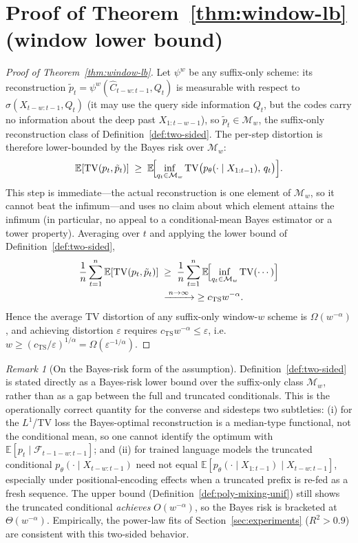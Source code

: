 \documentclass[11pt]{article}
\newcommand{\E}{\mathbb{E}}
\newcommand{\F}{\mathcal{F}}
\newcommand{\Chat}{\hat{C}}
\newcommand{\TV}{\mathrm{TV}}
\theoremstyle{plain}
\theoremstyle{definition}
\theoremstyle{remark}
\newtheorem{remark}[theorem]{Remark}
\begin{document}
\section{Proof of Theorem~\ref{thm:window-lb} (window lower bound)}
\label{app:window-lb}

\begin{proof}[Proof of Theorem~\ref{thm:window-lb}]
Let $\psi^w$ be any suffix-only scheme: its reconstruction
$\tilde p_t = \psi^w(\Chat_{t-w:t-1}, Q_t)$ is measurable with
respect to $\sigma(X_{t-w:t-1}, Q_t)$ (it may use the query side
information $Q_t$, but the codes carry no information about the deep
past $X_{1:t-w-1}$), so $\tilde p_t \in \mathcal{M}_w$, the
suffix-only reconstruction class of
Definition~\ref{def:two-sided}. The per-step distortion is
therefore lower-bounded by the Bayes risk over $\mathcal{M}_w$:
\[
\E[\TV(p_t, \tilde p_t)]
\;\geq\;
\E\!\Bigl[\inf_{q_t \in \mathcal{M}_w}
   \TV\bigl(p_\theta(\cdot \mid X_{1:t-1}),\, q_t\bigr)\Bigr].
\]
This step is immediate---the actual reconstruction is one element
of $\mathcal{M}_w$, so it cannot beat the infimum---and uses no
claim about which element attains the infimum (in particular, no
appeal to a conditional-mean Bayes estimator or a tower property).
Averaging over $t$ and applying the lower bound of
Definition~\ref{def:two-sided},
\[
\begin{split}
\frac{1}{n}\sum_{t=1}^n \E[\TV(p_t, \tilde p_t)]
&\;\geq\;
\frac{1}{n}\sum_{t=1}^n \E\!\Bigl[\inf_{q_t \in \mathcal{M}_w}
   \TV(\cdots)\Bigr]\\
&\;\xrightarrow{\;n\to\infty\;}\;
\geq c_{\mathrm{TS}} w^{-\alpha}.
\end{split}
\]
Hence the average TV distortion of any suffix-only window-$w$
scheme is $\Omega(w^{-\alpha})$, and achieving distortion
$\varepsilon$ requires $c_{\mathrm{TS}} w^{-\alpha} \leq
\varepsilon$, i.e.\ $w \geq (c_{\mathrm{TS}}/\varepsilon)^{1/\alpha}
= \Omega(\varepsilon^{-1/\alpha})$.
\end{proof}

\begin{remark}[On the Bayes-risk form of the assumption]
Definition~\ref{def:two-sided} is stated directly as a Bayes-risk
lower bound over the suffix-only class $\mathcal{M}_w$, rather than
as a gap between the full and truncated conditionals. This is the
operationally correct quantity for the converse and sidesteps two
subtleties: (i) for the $L^1$/TV loss the Bayes-optimal
reconstruction is a median-type functional, not the conditional
mean, so one cannot identify the optimum with $\E[p_t \mid
\F_{t-1-w:t-1}]$; and (ii) for trained language models the
truncated conditional $p_\theta(\cdot \mid X_{t-w:t-1})$ need not
equal $\E[p_\theta(\cdot \mid X_{1:t-1}) \mid X_{t-w:t-1}]$,
especially under positional-encoding effects when a truncated
prefix is re-fed as a fresh sequence. The upper bound
(Definition~\ref{def:poly-mixing-unif}) still shows the truncated
conditional \emph{achieves} $O(w^{-\alpha})$, so the Bayes risk is
bracketed at $\Theta(w^{-\alpha})$. Empirically, the power-law fits
of Section~\ref{sec:experiments} ($R^2 > 0.9$) are consistent with
this two-sided behavior.
\end{remark}
\end{document}
